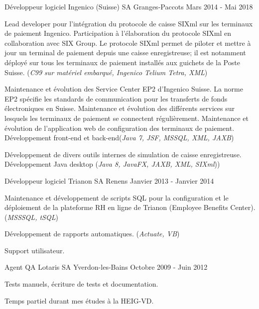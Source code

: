 \begin{cventries}
\cventry
{Développeur logiciel} %
{Ingenico (Suisse) SA} %
{Granges-Paccots} %
{Mars 2014 - Mai 2018} %
{ %
\begin{cvitems}
\item {Lead developer pour l'intégration du protocole de caisse SIXml sur les terminaux de paiement Ingenico. Participation à l'élaboration du protocole SIXml en collaboration avec SIX Group. Le protocole SIXml permet de piloter et mettre à jour un terminal de paiement depuis une caisse enregistreuse; il est notamment déployé sur tous les terminaux de paiement installés aux guichets de la Poste Suisse. (\emph{C99 sur matériel embarqué, Ingenico Telium Tetra, XML})}
\item {Maintenance et évolution des Service Center EP2 d'Ingenico Suisse. La norme EP2 spécifie les standards de communication pour les transferts de fonds électroniques en Suisse. Maintenance et évolution des différents services sur lesquels les terminaux de paiement se connectent régulièrement. Maintenance et évolution de l'application web de configuration des terminaux de paiement. Développement front-end et back-end(\emph{Java 7, JSF, MSSQL, XML, JAXB})}
\item {Développement de divers outils internes de simulation de caisse enregistreuse. Développement Java desktop (\emph{Java 8, JavaFX, JAXB, XML, SIXml}))}
\end{cvitems}
}


\cventry
{Développeur logiciel} %
{Trianon SA} %
{Renens} %
{Janvier 2013 - Janvier 2014} %
{ %
\begin{cvitems}
\item {Maintenance et développement de scripts SQL pour la configuration et le déploiement de la plateforme RH en ligne de Trianon (Employee Benefits Center). (\emph{MSSSQL, tSQL})}
\item {Développement de rapports automatiques. (\emph{Actuate, VB})}
\item {Support utilisateur.}
\end{cvitems} 
}


\cventry
{Agent QA} %
{Lotaris SA} %
{Yverdon-les-Bains} %
{Octobre 2009 - Juin 2012} %
{ %
\begin{cvitems}
\item {Tests manuels, écriture de tests et documentation.}
\item {Temps partiel durant mes études à la HEIG-VD.}
\end{cvitems}
}


\end{cventries}
